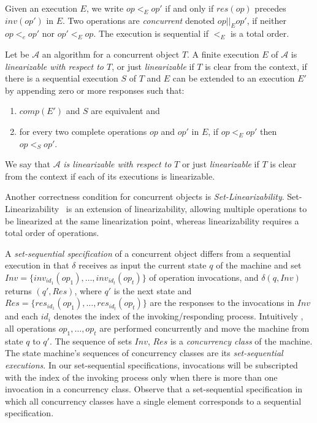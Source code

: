 Given an execution \(E\), we write \(op <_E op'\) if and only if \(res(op)\) precedes \(inv(op')\) in \(E\). Two operations are \emph{concurrent} denoted \(op||_E op' \), if neither \(op <_e op'\) nor \(op' <_E op\). The execution is sequential if \(<_E\) is a total order.

\begin{definition}
Let be \(\mathcal{A}\) an algorithm for a concurrent object \(T\). A finite execution \(E\) of \(\mathcal{A}\) is \emph{linearizable with respect to \(T\)}, or just \emph{linearizable} if \(T\) is clear from the context, if there is a sequential execution \(S\) of \(T\) and \(E\) can be extended to an execution \(E'\) by appending zero or more responses such that:

\begin{enumerate}
    \item \(comp(E')\) and \(S\) are equivalent and
    \item for every two complete operations \(op\) and \(op'\) in \(E\), if \(op <_E op'\) then \(op <_S op'\).
\end{enumerate}

We say that \(\mathcal{A}\) \emph{is linearizable with respect to} \(T\) or just \emph{linearizable} if \(T\) is clear from the context if each of its executions is linearizable.
\end{definition}

Another correctness condition for concurrent objects is \emph{Set-Linearizability}. Set-Linearizability~\cite{DBLP_journals_jacm_CastanedaRR18, DBLP_conf_podc_Neiger94} is an extension of linearizability, allowing multiple operations to be linearized at the same linearization point, whereas linearizability requires a total order of operations.


A \emph{set-sequential specification} of a concurrent object differs from a sequential execution in that \(\delta\) receives as input the current state \(q\) of the machine and set \(Inv = \{inv_{id_1}(op_1), \ldots, inv_{id_t}(op_t)\}\) of operation invocations, and \(\delta(q, Inv)\) returns \((q', Res)\), where \(q'\) is the next state and \(Res = \{res_{id_1}(op_1), \ldots, res_{id_t}(op_t)\}\) are the responses to the invocations in \(Inv\) and each \(id_i\) denotes the index of the invoking/responding process. Intuitively , all operations \(op_1, \ldots, op_t\) are performed concurrently and move the machine from state \(q\) to \(q'\). The sequence of sets \(Inv\), \(Res\) is a \emph{concurrency class} of the machine. The state machine's sequences of concurrency classes are its \emph{set-sequential executions}. In our set-sequential specifications, invocations will be subscripted with the index of the invoking process only when there is more than one invocation in a concurrency class. Observe that a set-sequential specification in which all concurrency classes have a single element corresponds to a sequential specification.

